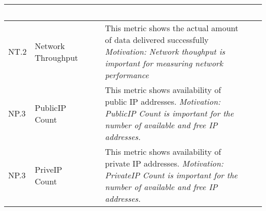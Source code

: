 \begin{table*}[p]
\begin{scriptsize}
\begin{center}
\begin{tabular}{lp{}p{}p{}p{}}
~ \\
\hline
NT.2 &
Network Throughput&
~&
This metric shows the actual amount of data delivered successfully 
{\it Motivation: Network thoughput is important for measuring network performance} &
~ \\
\hline
NP.3 &
PublicIP Count &
~&
This metric shows availability of public IP addresses. 
{\it Motivation: PublicIP Count is important for the number of available and free IP addresses.} &
~ \\
\hline
NP.3 &
PriveIP Count &
~& 
This metric shows availability of private IP addresses. 
{\it Motivation: PrivateIP Count is important for the number of available and free IP addresses.} &
~ \\
\hline
\end{tabular}
\end{center}
\end{scriptsize}
\end{table*}


